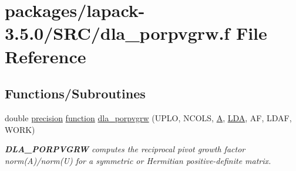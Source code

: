 \hypertarget{dla__porpvgrw_8f}{}\section{packages/lapack-\/3.5.0/\+S\+R\+C/dla\+\_\+porpvgrw.f File Reference}
\label{dla__porpvgrw_8f}
\subsection*{Functions/\+Subroutines}
\begin{DoxyCompactItemize}
\item 
double \hyperlink{numinquire_8h_a2c8e616467665d0b2814d4c1589ba74e}{precision} \hyperlink{afunc_8m_a7b5e596df91eadea6c537c0825e894a7}{function} \hyperlink{group__doublePOcomputational_gae755aeaf7b038f598514b34d013953ff}{dla\+\_\+porpvgrw} (U\+P\+L\+O, N\+C\+O\+L\+S, \hyperlink{classA}{A}, \hyperlink{example__user_8c_ae946da542ce0db94dced19b2ecefd1aa}{L\+D\+A}, A\+F, L\+D\+A\+F, W\+O\+R\+K)
\begin{DoxyCompactList}\small\item\em {\bfseries D\+L\+A\+\_\+\+P\+O\+R\+P\+V\+G\+R\+W} computes the reciprocal pivot growth factor norm(\+A)/norm(U) for a symmetric or Hermitian positive-\/definite matrix. \end{DoxyCompactList}\end{DoxyCompactItemize}
